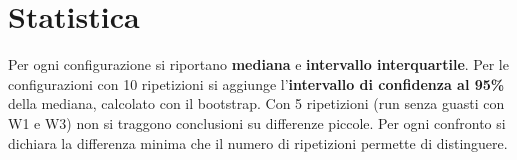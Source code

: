 \section{Statistica}

Per ogni configurazione si riportano \textbf{mediana} e \textbf{intervallo interquartile}. Per le configurazioni con 10 ripetizioni si aggiunge l'\textbf{intervallo di confidenza al 95\%} della mediana, calcolato con il bootstrap. Con 5 ripetizioni (run senza guasti con W1 e W3) non si traggono conclusioni su differenze piccole. Per ogni confronto si dichiara la differenza minima che il numero di ripetizioni permette di distinguere.
